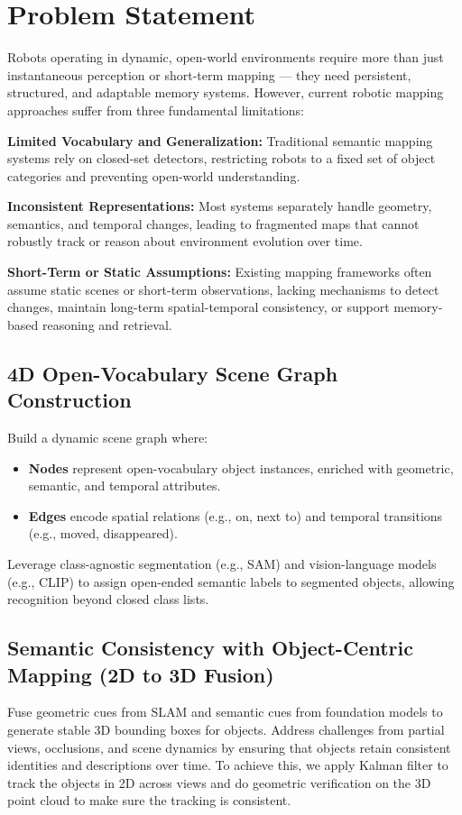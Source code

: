\section{Problem Statement}

Robots operating in dynamic, open-world environments require more than just instantaneous perception or short-term mapping — they need persistent, structured, and adaptable memory systems. However, current robotic mapping approaches suffer from three fundamental limitations:

\textbf{Limited Vocabulary and Generalization:} Traditional semantic mapping systems rely on closed-set detectors, restricting robots to a fixed set of object categories and preventing open-world understanding.

\textbf{Inconsistent Representations:} Most systems separately handle geometry, semantics, and temporal changes, leading to fragmented maps that cannot robustly track or reason about environment evolution over time.

\textbf{Short-Term or Static Assumptions:} Existing mapping frameworks often assume static scenes or short-term observations, lacking mechanisms to detect changes, maintain long-term spatial-temporal consistency, or support memory-based reasoning and retrieval.



\subsection{4D Open-Vocabulary Scene Graph Construction}

Build a dynamic scene graph where:
\begin{itemize}
    \item \textbf{Nodes} represent open-vocabulary object instances, enriched with geometric, semantic, and temporal attributes.
    \item \textbf{Edges} encode spatial relations (e.g., on, next to) and temporal transitions (e.g., moved, disappeared).
\end{itemize}

Leverage class-agnostic segmentation (e.g., SAM) and vision-language models (e.g., CLIP) to assign open-ended semantic labels to segmented objects, allowing recognition beyond closed class lists.


\subsection{Semantic Consistency with Object-Centric Mapping (2D to 3D Fusion)}
Fuse geometric cues from SLAM and semantic cues from foundation models to generate stable 3D bounding boxes for objects. Address challenges from partial views, occlusions, and scene dynamics by ensuring that objects retain consistent identities and descriptions over time. To achieve this, we apply Kalman filter to track the objects in 2D across views and do geometric verification on the 3D point cloud to make sure the tracking is consistent.  

